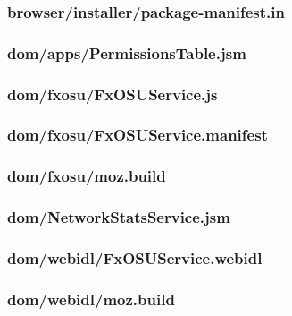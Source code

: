 \documentclass[12pt]{article}
\begin{document}
\subsubsection{browser/installer/package-manifest.in}

\pagebreak

\subsubsection{dom/apps/PermissionsTable.jsm}

\pagebreak

\subsubsection{dom/fxosu/FxOSUService.js}

\pagebreak

\subsubsection{dom/fxosu/FxOSUService.manifest}

\pagebreak

\subsubsection{dom/fxosu/moz.build}

\pagebreak

\subsubsection{dom/NetworkStatsService.jsm}

\pagebreak

\subsubsection{dom/webidl/FxOSUService.webidl}

\pagebreak

\subsubsection{dom/webidl/moz.build}

\pagebreak
\end{document}
